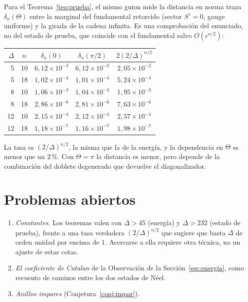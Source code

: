 \documentclass[11pt,a4paper]{article}
\theoremstyle{remark}
\begin{document}
Para el Teorema~\ref{teo:prueba}, el mismo guion mide la distancia en norma traza
$\delta_n(\Theta)$ entre la marginal del fundamental retorcido (sector $S^z=0$, gauge uniforme) y la
girada de la cadena infinita. Es una comprobación del enunciado, no del estado de prueba, que coincide
con el fundamental salvo $O(\epsilon^{n/2})$:
\begin{center}\small
\begin{tabular}{rcccc}
\toprule
$\Delta$ & $n$ & $\delta_n(0)$ & $\delta_n(\pi/2)$ & $2(2/\Delta)^{n/2}$\\
\midrule
5 & 10 & $6{,}12\times10^{-3}$ & $6{,}12\times10^{-3}$ & $2{,}05\times10^{-2}$\\
5 & 18 & $1{,}02\times10^{-4}$ & $1{,}01\times10^{-4}$ & $5{,}24\times10^{-4}$\\
8 & 10 & $1{,}06\times10^{-3}$ & $1{,}04\times10^{-3}$ & $1{,}95\times10^{-3}$\\
8 & 18 & $2{,}86\times10^{-6}$ & $2{,}81\times10^{-6}$ & $7{,}63\times10^{-6}$\\
12 & 10 & $2{,}15\times10^{-4}$ & $2{,}12\times10^{-4}$ & $2{,}57\times10^{-4}$\\
12 & 18 & $1{,}18\times10^{-7}$ & $1{,}16\times10^{-7}$ & $1{,}98\times10^{-7}$\\
\bottomrule
\end{tabular}
\end{center}
La tasa es $(2/\Delta)^{n/2}$, la misma que la de la energía, y la dependencia en $\Theta$ es menor que
un $2$\,\%. Con $\Theta=\pi$ la distancia es menor, pero depende de la combinación del doblete
degenerado que devuelve el diagonalizador.

\section{Problemas abiertos}\label{sec:abiertos}

\begin{enumerate}
\item \emph{Constantes.} Los teoremas valen con $\Delta>45$ (energía) y $\Delta>232$ (estado de prueba),
  frente a una tasa verdadera $(2/\Delta)^{n/2}$ que sugiere que basta $\Delta$ de orden unidad
  por encima de $1$. Acercarse a ella requiere otra técnica, no un ajuste de estas cotas.
\item \emph{El coeficiente de Catalan} de la Observación de la Sección~\ref{sec:energia}, como
  recuento de caminos entre los dos estados de Néel.
\item \emph{Anillos impares} (Conjetura~\ref{conj:impar}).
\end{enumerate}
\end{document}
